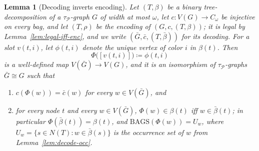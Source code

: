 \documentclass[11pt]{article}
\newtheorem{lemma}[theorem]{Lemma}
\theoremstyle{definition}
\newcommand{\defeq}{\coloneqq}
\newcommand{\Bags}{\mathrm{BAGS}}
\newcommand{\Pred}{\mathcal P}
\begin{document}
\begin{lemma}[Decoding inverts encoding]\label{lem:decode-enc}
Let \((T,\beta)\) be a binary tree-decomposition of a \(\tau_{\Pred}\)-graph
\(G\) of width at most \(\omega\), let \(c:V(G)\to C_\omega\) be injective on
every bag, and let \((T,\rho)\) be the encoding of \((G,c,(T,\beta))\); it is
legal by Lemma~\ref{lem:legal-iff-enc}, and we write
\((\bar G,\bar c,(T,\bar\beta))\) for its decoding.  For a slot \(v(t,i)\), let
\(\phi(t,i)\) denote the unique vertex of color \(i\) in \(\beta(t)\).  Then
\[
  \Phi\bigl([v(t,i)]\bigr)\defeq\phi(t,i)
\]
is a well-defined map \(V(\bar G)\to V(G)\), and it is an isomorphism of
\(\tau_{\Pred}\)-graphs \(\bar G\cong G\) such that
\begin{enumerate}[label=\textup{(\roman*)}]
  \item \(c(\Phi(w))=\bar c(w)\) for every \(w\in V(\bar G)\), and
  \item for every node \(t\) and every \(w\in V(\bar G)\),
    \(\Phi(w)\in\beta(t)\) iff \(w\in\bar\beta(t)\); in particular
    \(\Phi(\bar\beta(t))=\beta(t)\), and \(\Bags(\Phi(w))=U_w\), where
    \(U_w=\{s\in N(T):w\in\bar\beta(s)\}\) is the occurrence set of \(w\)
    from Lemma~\ref{lem:decode-occ}.
\end{enumerate}
\end{lemma}
\end{document}
